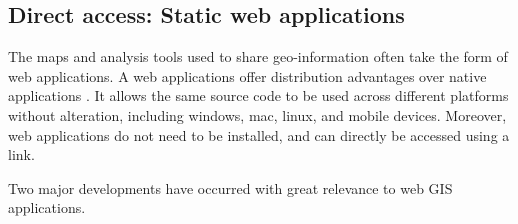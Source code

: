 








\subsection*{Direct access: Static web applications}

The maps and analysis tools used to share geo-information often take the form of web applications.  
A web applications offer distribution advantages over native applications \citep{kuhail_characterizing_2021, panidi_hybrid_2015}. 
It allows the same source code to be used across different platforms without alteration, including windows, mac, linux, and mobile devices. 
Moreover, web applications do not need to be installed, and can directly be accessed using a link. 

Two major developments have occurred with great relevance to web GIS applications.

